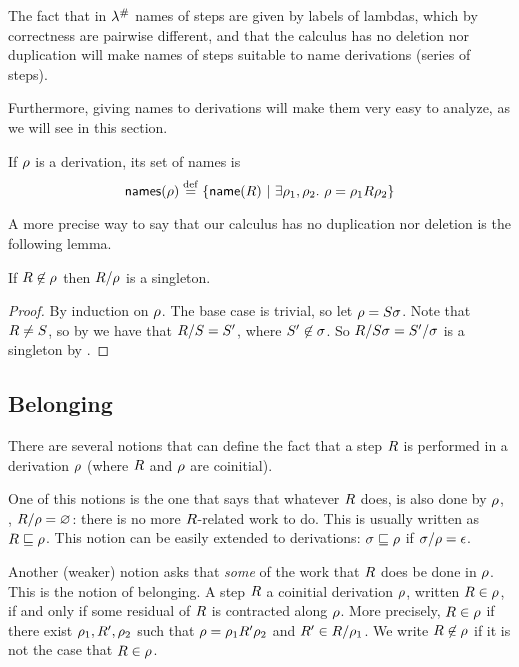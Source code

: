 
The fact that in $\lambda^{\mathtt{\#}}$ names of steps
are given by labels of lambdas, which by correctness are pairwise different,
and that the calculus has no deletion nor duplication will
make names of steps suitable to name derivations (\ie series of steps).

Furthermore, giving names to derivations will make them very easy to analyze, as we
will see in this section.

\begin{definition}
If $\rho$ is a derivation, its set of names is
\[
  \mathsf{names}(\rho) \overset{\mathrm{def}}{=} \{\mathsf{name}(R) \ |\  \exists \rho_1,\rho_2.\ \rho = \rho_1R\rho_2\}
\]
\end{definition}

A more precise way to say that our calculus has no duplication nor deletion is the following lemma.

\begin{lemma}[Permanence]
If $R \not\in \rho$ then $R/\rho$ is a singleton.
\end{lemma}
\begin{proof}
By induction on $\rho$. The base case is trivial, so let $\rho = S\sigma$. 
Note that $R \neq S$, so by 
we have that $R/S = S'$,
where $S' \not\in \sigma$.
So $R/S\sigma = S'/\sigma$ is a singleton by \ih.
\end{proof}

\subsection*{Belonging}

There are several notions that can define the fact that a step $R$ is performed in
a derivation $\rho$ (where $R$ and $\rho$ are coinitial).

One of this notions is the one that says that whatever $R$ does,
is also done by $\rho$, \ie, $R / \rho = \varnothing$:
there is no more $R$-related work to do. This is usually written as
$R \sqsubseteq \rho$. This notion can be easily extended to derivations:
$\sigma \sqsubseteq \rho$ if $\sigma / \rho = \epsilon$.

Another (weaker) notion asks that \emph{some} of the work that $R$ does be
done in $\rho$. This is the notion of belonging.
A step $R$  a coinitial derivation $\rho$,
written $R \in \rho$,
if and only if some residual of $R$ is contracted along $\rho$. 
More precisely, $R \in \rho$ if there exist $\rho_1,R',\rho_2$
such that $\rho = \rho_1R'\rho_2$ and $R' \in R/\rho_1$.
We write $R \not\in \rho$ if it is not the case that $R \in \rho$.

